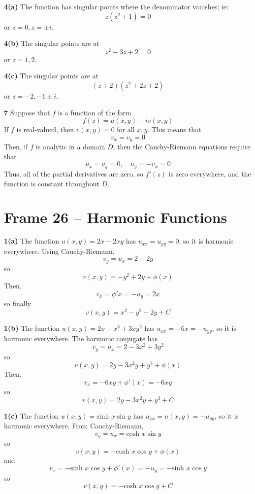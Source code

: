 \documentclass{article}
\begin{document}
\textbf{4(a)}
The function has singular points where the denominator vanishes; ie:
\[
	z(z^2 + 1) = 0
\]
or $z = 0, z = \pm i$.

\textbf{4(b)}
The singular points are at
\[
	z^2 - 3z + 2 = 0
\]
or $z = 1, 2$.

\textbf{4(c)}
The singular points are at
\[
	(z + 2)(z^2 + 2z + 2)
\]
or $z = -2, -1 \pm i$.

\textbf{7}
Suppose that $f$ is a function of the form
\[
	f(z) = u(x, y) + iv(x, y)
\]
If $f$ is real-valued, then $v(x, y) = 0$ for all $x, y$. This means that
\[
	v_x = v_y = 0
\]
Then, if $f$ is analytic in a domain $D$, then the Cauchy-Riemann equations require that
\[
	u_x = v_y = 0,	\quad	u_y = -v_x = 0
\]
Thus, all of the partial derivatives are zero, so $f'(z)$ is zero everywhere, and the function is constant throughout $D$.


\clearpage
\section{Frame 26 -- Harmonic Functions}
\textbf{1(a)}
The function $u(x, y) = 2x - 2xy$ has $u_{xx} = u_{yy} = 0$, so it is harmonic everywhere. Using Cauchy-Riemann,
\[
	v_y = u_x = 2 - 2y
\]
so
\[
	v(x, y) = -y^2 + 2y + \phi(x)
\]
Then,
\[
	v_x = \phi'{x} = -u_y = 2x
\]
so finally
\[
	v(x, y) = x^2 - y^2 + 2y +C
\]

\textbf{1(b)}
The function $u(x, y) = 2x - x^3 + 3xy^2$ has $u_{xx} = -6x = -u_{yy}$, so it is harmonic everywhere. The harmonic conjugate has
\[
	v_y = u_x = 2 - 3x^2 + 3y^2
\]
so
\[
	v(x, y) = 2y - 3x^2y + y^3 + \phi(x)
\]
Then,
\[
	v_x = -6xy + \phi'(x) = -6xy
\]
so
\[
	v(x, y) = 2y - 3x^2y + y^3 + C
\]

\textbf{1(c)}
The function $u(x, y) = \text{sinh } x \sin y$ has $u_{xx} = u(x, y) = -u_{yy}$, so it is harmonic everywhere. From Cauchy-Riemann,
\[
	v_y = u_x = \text{cosh } x \sin y
\]
so
\[
	v(x, y) = - \text{cosh } x \cos y + \phi(x)
\]
and
\[
	v_x = - \text{sinh } x \cos y + \phi'(x) = -u_y = -\text{sinh } x \cos y
\]
so
\[
	v(x, y) = - \text{cosh } x \cos y + C
\]
\end{document}
